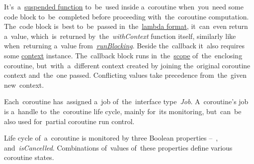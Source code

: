 It's~a~\hyperref[kotlinsuspendfunction]{suspended function} to~be~used inside a~coroutine when~you~need some code block to~be~completed before proceeding with~the~coroutine computation.
The~code block is~best to~be~passed in~the~\hyperref[kotlinlambda]{lambda format}, it~can~even return a~value, which~is~returned \mbox{by the \textit{withContext}} function itself, similarly like when~returning a~value \mbox{from \hyperref[kotlincoroutinerunblocking]{\textit{runBlocking}}.}
Beside the~callback it~also requires some \hyperref[kotlincoroutinecontext]{context} instance.
The~callback block runs in~the~\hyperref[kotlincoroutinescope]{scope} of~the~enclosing coroutine, but~with~a~different context created by joining the~original coroutine context and~the~one passed.
Conflicting values take precedence from~the~given new~context.


\label{kotlincoroutinejob}
Each~coroutine has~assigned a~job of~the~interface \mbox{type \textit{Job}}.
A~coroutine's job is a~handle to~the~coroutine life cycle, mainly for~its monitoring, but~can~be also used for~partial coroutine run control.

Life cycle of~a~coroutine is monitored by three Boolean properties --~,  \mbox{and \textit{isCancelled}}.
Combinations of~values of~these properties define various coroutine states.

